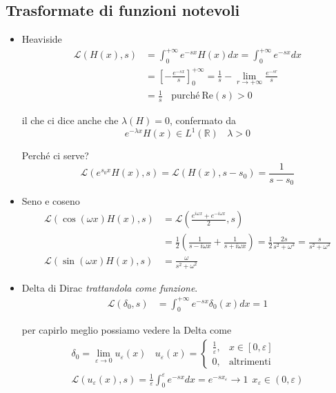 \subsection{Trasformate di funzioni notevoli}
\begin{itemize}
\item Heaviside\begin{align*}
\mathcal{L}( H( x) ,s) & =\int ^{+\infty }_{0} e^{-sx} H( x) dx=\int ^{+\infty }_{0} e^{-sx} dx\\
 & =\left[ -\frac{e^{-sx}}{s}\right]^{+\infty }_{0} =\frac{1}{s} -\lim _{r\rightarrow +\infty }\frac{e^{-sr}}{s}\\
 & =\frac{1}{s} \ \ \ \ \text{purché} \ \mathrm{Re}( s)  >0
\end{align*}

il che ci dice anche che $\lambda ( H) =0$, confermato da\begin{equation*}
e^{-\lambda x} H( x) \in L^{1}(\mathbb{R}) \ \ \ \ \lambda  >0
\end{equation*}

Perché ci serve?\begin{equation*}
\mathcal{L}\left( e^{s_{0} x} H( x) ,s\right) =\mathcal{L}( H( x) ,s-s_{0}) =\frac{1}{s-s_{0}}
\end{equation*}
\item Seno e coseno\begin{align*}
\mathcal{L}(\cos( \omega x) H( x) ,s) & =\mathcal{L}\left(\frac{e^{i\omega x} +e^{-i\omega x}}{2} ,s\right)\\
 & =\frac{1}{2}\left(\frac{1}{s-i\omega x} +\frac{1}{s+i\omega x}\right) =\frac{1}{2}\frac{2s}{s^{2} +\omega ^{2}} =\frac{s}{s^{2} +\omega ^{2}}\\
\mathcal{L}(\sin( \omega x) H( x) ,s) & =\frac{\omega }{s^{2} +\omega ^{2}}
\end{align*}
\item Delta di Dirac \textit{trattandola come funzione}.\begin{align*}
\mathcal{L}( \delta _{0} ,s) & =\int ^{+\infty }_{0} e^{-sx} \delta _{0}( x) dx=1
\end{align*}

per capirlo meglio possiamo vedere la Delta come\begin{gather*}
\delta _{0} =\lim\limits _{\varepsilon \rightarrow 0} u_{\varepsilon }( x) \ \ \ \ u_{\varepsilon }( x) =\begin{cases}
\frac{1}{\varepsilon } , & x\in [ 0,\varepsilon ]\\
0, & \text{altrimenti}
\end{cases}\\
\mathcal{L}( u_{\varepsilon }( x) ,s) =\frac{1}{\varepsilon }\int ^{\varepsilon }_{0} e^{-sx} dx=e^{-sx_{\varepsilon }}\rightarrow 1\ \ x_{\varepsilon } \in ( 0,\varepsilon )
\end{gather*}
\end{itemize}
